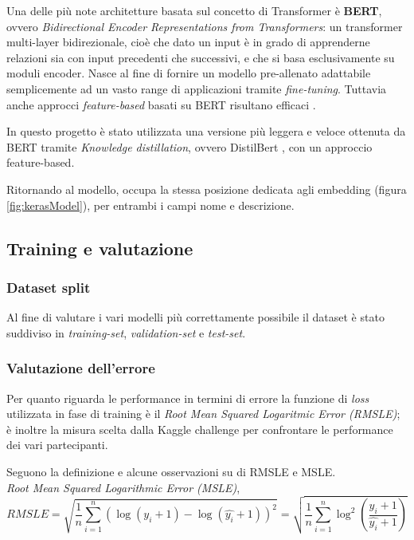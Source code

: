 

Una delle più note architetture basata sul concetto di Transformer è
\textbf{BERT}, ovvero \textit{Bidirectional Encoder Representations from
	Transformers}: un transformer multi-layer bidirezionale, cioè che dato un input
è in grado di apprenderne relazioni sia con input precedenti che successivi, e
che si basa esclusivamente su moduli encoder. Nasce al fine di fornire un
modello pre-allenato adattabile semplicemente ad un vasto range di applicazioni
tramite \textit{fine-tuning}. Tuttavia anche approcci \textit{feature-based}
basati su BERT risultano efficaci \cite{devlin2018bert}.

In questo progetto è stato utilizzata una versione più leggera e veloce ottenuta
da BERT tramite \textit{Knowledge distillation}, ovvero DistilBert
\cite{sanh2020distilbert}, con un approccio feature-based.

Ritornando al modello, occupa la stessa posizione dedicata agli embedding
(figura \ref{fig:kerasModel}), per entrambi i campi nome e descrizione.

\subsection{Training e valutazione}

\subsubsection{Dataset split}

Al fine di valutare i vari modelli più correttamente possibile il dataset è
stato suddiviso in \textit{training-set}, \textit{validation-set} e
\textit{test-set}.

\subsubsection{Valutazione dell'errore}

Per quanto riguarda le performance in termini di errore la funzione di
\textit{loss} utilizzata in fase di training è il \textit{Root Mean Squared
	Logaritmic Error (RMSLE)}; è inoltre la misura scelta dalla Kaggle challenge
per confrontare le performance dei vari partecipanti.

Seguono la definizione e alcune osservazioni su di RMSLE e MSLE.
\\
\textit{Root Mean Squared Logarithmic Error (MSLE)}, 
\begin{equation}
	RMSLE
	=
	\sqrt{
	\frac{1}{n}
	\sum_{i=1}^{n}
	( \log(y_i+1) - \log(\hat{y_i}+1) )^2
	}
	=
	\sqrt{
		\frac{1}{n}
		\sum_{i=1}^{n}
		\log^2(\frac{y_i+1}{\hat{y_i}+1})
	}
\end{equation}

